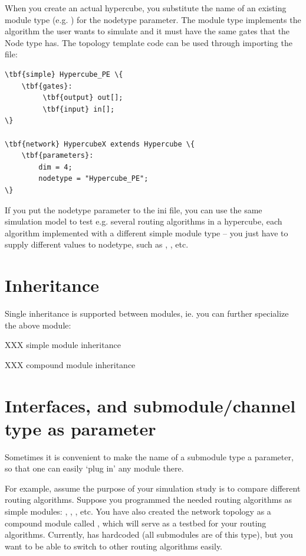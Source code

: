 When you create an actual hypercube, you substitute the name
of an existing module type (e.g. ) for the nodetype
parameter. The module type implements the algorithm the user
wants to simulate and it must have the same gates that the Node
type has. The topology template code can be used through importing
the file:

\begin{Verbatim}[commandchars=\\\{\}]
\tbf{simple} Hypercube_PE \{
    \tbf{gates}:
         \tbf{output} out[];
         \tbf{input} in[];
\}

\tbf{network} HypercubeX extends Hypercube \{
    \tbf{parameters}:
        dim = 4;
        nodetype = "Hypercube_PE";
\}
\end{Verbatim}

If you put the nodetype parameter to the ini file, you can use the
same simulation model to test e.g. several routing algorithms in a
hypercube, each algorithm implemented with a different
simple module type -- you just have to supply
different values to nodetype, such as ,
, etc.



\section{Inheritance}
\label{sec:ch-ned-lang:inheritance}

Single inheritance is supported between modules, ie. you can further
specialize the above module:

XXX simple module inheritance

XXX compound module inheritance




\section{Interfaces, and submodule/channel type as parameter}
\label{sec:ch-ned-lang:like}

Sometimes it is convenient to make the name of a submodule type a parameter,
so that one can easily `plug in' any module there.

For example, assume the purpose of your simulation study is
to compare different routing algorithms. Suppose you programmed
the needed routing algorithms as simple modules: ,
, , etc.
You have also created the network topology as a compound module
called , which will serve as a testbed for your routing
algorithms. Currently,  has 
hardcoded (all submodules are of this type), but you want
to be able to switch to other routing algorithms easily.

